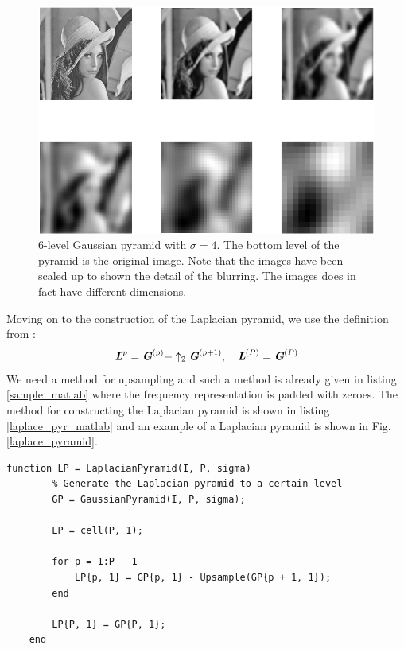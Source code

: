 \documentclass[a4paper, 10pt, final]{article}
\begin{document}
\begin{figure}[!h]
    \centering
    \includegraphics[angle=0,width=\textwidth]{images/gauss_pyr_6_4}
    \caption{6-level Gaussian pyramid with $\sigma = 4$. The
    bottom level of the pyramid is the original image. Note that the
    images have been scaled up to shown the detail of the blurring. The
    images does in fact have different dimensions.}
    \label{gauss_pyramid}
\end{figure}

Moving on to the construction of the Laplacian pyramid, we use the
definition from \citep[Eq. (5.10)]{jahne-digital}:
\begin{equation}
    \textbf{\em L}^{p} = \textbf{\em G}^{(p)} - \uparrow_2\textbf{\em G}^{(p + 1)}, ~~~
    \textbf{\em L}^{(P)} = \textbf{\em G}^{(P)}
    \label{laplace_pyr_def}
\end{equation}
We need a method for upsampling and such a method is already given in
listing \ref{sample_matlab} where the frequency representation is padded
with zeroes. The method for constructing the Laplacian pyramid is shown
in listing \ref{laplace_pyr_matlab} and an example of a Laplacian
pyramid is shown in Fig. \ref{laplace_pyramid}.

\begin{lstlisting}[caption={Construction of the Laplacian pyramid.
    $P$ is the number of levels in the pyramid. First, the Gaussian
    pyramid is contructed from which we build the Laplacian pyramid
    using Eq. \eqref{laplace_pyr_def}.}, captionpos=b,
    label={laplace_pyr_matlab}, float=b, numbers=none]
    function LP = LaplacianPyramid(I, P, sigma)
        % Generate the Laplacian pyramid to a certain level
        GP = GaussianPyramid(I, P, sigma);
        
        LP = cell(P, 1);
        
        for p = 1:P - 1
            LP{p, 1} = GP{p, 1} - Upsample(GP{p + 1, 1});
        end
        
        LP{P, 1} = GP{P, 1};
    end
\end{lstlisting}
\end{document}
